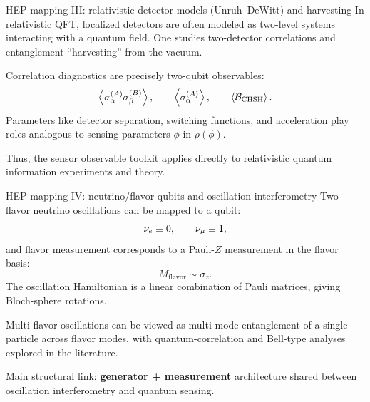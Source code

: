 \documentclass[aspectratio=169]{beamer}
\begin{document}
\begin{frame}{HEP mapping III: relativistic detector models (Unruh--DeWitt) and harvesting}
\small
In relativistic QFT, localized detectors are often modeled as two-level systems interacting with a quantum field.
One studies two-detector correlations and entanglement ``harvesting'' from the vacuum. \citep{PeresTerno2004RMP,PozasKerstjensMartinMartinez2015PRD}

\vspace{0.35em}
Correlation diagnostics are precisely two-qubit observables:
\[
\expval{\sigma_\alpha^{(A)}\sigma_\beta^{(B)}},\qquad
\expval{\sigma_\alpha^{(A)}},\qquad
\expval{\mathcal{B}_{\mathrm{CHSH}}}.
\]
Parameters like detector separation, switching functions, and acceleration play roles analogous to sensing parameters $\phi$ in $\rho(\phi)$.

\vspace{0.35em}
Thus, the sensor observable toolkit applies directly to relativistic quantum information experiments and theory.
\end{frame}

\begin{frame}{HEP mapping IV: neutrino/flavor qubits and oscillation interferometry}
\small
Two-flavor neutrino oscillations can be mapped to a qubit:
\[
\relax{\nu_e}\equiv\relax{0},\qquad \relax{\nu_\mu}\equiv\relax{1},
\]
and flavor measurement corresponds to a Pauli-$Z$ measurement in the flavor basis:
\[
M_{\mathrm{flavor}}\sim \sigma_z.
\]
The oscillation Hamiltonian is a linear combination of Pauli matrices, giving Bloch-sphere rotations.

\vspace{0.35em}
Multi-flavor oscillations can be viewed as multi-mode entanglement of a single particle across flavor modes,
with quantum-correlation and Bell-type analyses explored in the literature. \citep{Banerjee2015EPJC}

\vspace{0.35em}
Main structural link: \textbf{generator + measurement} architecture shared between oscillation interferometry and quantum sensing.
\end{frame}
\end{document}
